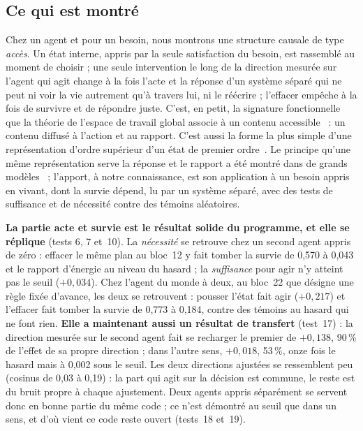 \documentclass[11pt,a4paper]{article}
\begin{document}
\subsection{Ce qui est montré}

Chez un agent et pour un besoin, nous montrons une structure causale de type
\emph{accès}. Un état interne, appris par la seule satisfaction du besoin, est
rassemblé au moment de choisir ; une seule intervention le long de la direction
mesurée sur l'agent qui agit change à la fois l'acte et la réponse d'un système séparé
qui ne peut ni voir la vie autrement qu'à travers lui, ni le réécrire ; l'effacer
empêche à la fois de survivre et de répondre juste. C'est, en petit, la signature
fonctionnelle que la théorie de l'espace de travail global associe à un contenu
accessible~\cite{baars1988,dehaene2001} : un contenu diffusé à l'action et au rapport.
C'est aussi la forme la plus simple d'une représentation d'ordre supérieur d'un état
de premier ordre~\cite{rosenthal2005,lau2011}. Le principe qu'une même représentation
serve la réponse et le rapport a été montré dans de grands
modèles~\cite{workspace2026} ; l'apport, à notre connaissance, est son application à
un besoin appris en vivant, dont la survie dépend, lu par un système séparé, avec des
tests de suffisance et de nécessité contre des témoins aléatoires.

\textbf{La partie acte et survie est le résultat solide du programme, et elle se
réplique} (tests 6, 7 et~10). La \emph{nécessité} se retrouve chez un second agent
appris de zéro : effacer le même plan au bloc~12 y fait tomber la survie de 0,570 à
0,043 et le rapport d'énergie au niveau du hasard ; la \emph{suffisance} pour agir n'y
atteint pas le seuil ($+0,034$). Chez l'agent du monde à deux, au bloc~22 que désigne
une règle fixée d'avance, les deux se retrouvent : pousser l'état fait agir
($+0,217$) et l'effacer fait tomber la survie de 0,773 à 0,184, contre des témoins au
hasard qui ne font rien. \textbf{Elle a maintenant aussi un résultat de transfert}
(test~17) : la direction mesurée sur le second agent fait se recharger le premier de
$+0,138$, 90\,\% de l'effet de sa propre direction ; dans l'autre sens, $+0,018$, 53\,\%,
onze fois le hasard mais à 0,002 sous le seuil. Les deux directions ajustées se
ressemblent peu (cosinus de 0,03 à 0,19) : la part qui agit sur la décision est commune,
le reste est du bruit propre à chaque ajustement. Deux agents appris séparément se servent
donc en bonne partie du même code ; ce n'est démontré au seuil que dans un sens, et d'où vient
ce code reste ouvert (tests~18 et~19).
\end{document}
